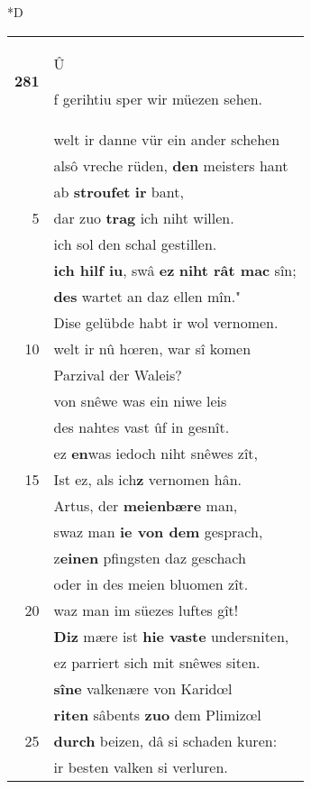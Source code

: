 \documentclass[8pt,a4paper,notitlepage]{article}
\begin{document}
\begin{table}[ht]
\begin{minipage}[t]{0.5\linewidth}
\small
\begin{center}*D
\end{center}
\begin{tabular}{rl}
\textbf{281} & \begin{large}Û\end{large}f gerihtiu sper wir müezen sehen.\\ 
 & welt ir danne vür ein ander schehen\\ 
 & alsô vreche rüden, \textbf{den} meisters hant\\ 
 & ab \textbf{stroufet} \textbf{ir} bant,\\ 
5 & dar zuo \textbf{trag} ich niht willen.\\ 
 & ich sol den schal gestillen.\\ 
 & \textbf{ich hilf iu}, swâ \textbf{ez} \textbf{niht rât mac} sîn;\\ 
 & \textbf{des} wartet an daz ellen mîn."\\ 
 & Dise gelübde habt ir wol vernomen.\\ 
10 & welt ir nû hœren, war sî komen\\ 
 & Parzival der Waleis?\\ 
 & von snêwe was ein niwe leis\\ 
 & des nahtes vast ûf in gesnît.\\ 
 & ez \textbf{en}was iedoch niht snêwes zît,\\ 
15 & Ist ez, als ich\textbf{z} vernomen hân.\\ 
 & Artus, der \textbf{meienbære} man,\\ 
 & swaz man \textbf{ie von dem} gesprach,\\ 
 & z\textbf{einen} pfingsten daz geschach\\ 
 & oder in des meien bluomen zît.\\ 
20 & waz man im süezes luftes gît!\\ 
 & \textbf{Diz} mære ist \textbf{hie vaste} undersniten,\\ 
 & ez parriert sich mit snêwes siten.\\ 
 & \textbf{sîne} valkenære von Karidœl\\ 
 & \textbf{riten} sâbents \textbf{zuo} dem Plimizœl\\ 
25 & \textbf{durch} beizen, dâ si schaden kuren:\\ 
 & ir besten valken si verluren.\\ 

\end{tabular}
\end{minipage}
\end{table}
\end{document}

